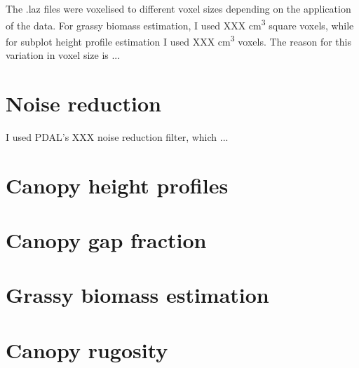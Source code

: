 \documentclass[11pt,a4paper]{article}
\begin{document}
The .laz files were voxelised to different voxel sizes depending on the application of the data. For grassy biomass estimation, I used XXX cm\textsuperscript{3} square voxels, while for subplot height profile estimation I used XXX cm\textsuperscript{3} voxels. The reason for this variation in voxel size is ...

\section{Noise reduction}

I used PDAL's XXX noise reduction filter, which ...

\section{Canopy height profiles}

\section{Canopy gap fraction}

\section{Grassy biomass estimation}

\section{Canopy rugosity}

\printbibliography
\end{document}
